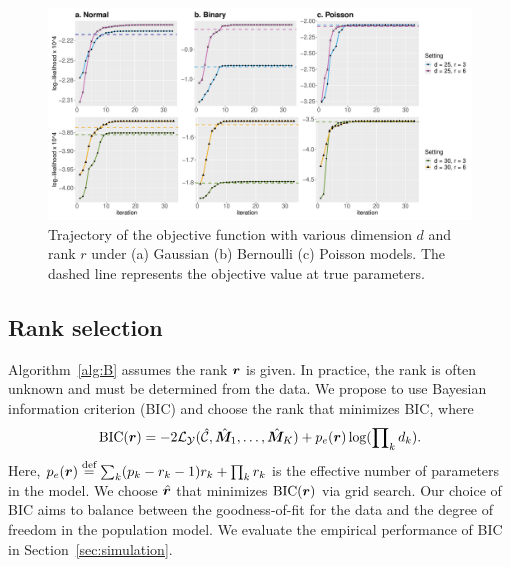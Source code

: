 \documentclass[12pt]{article}
\theoremstyle{definition}
\theoremstyle{definition}
\begin{document}
\begin{figure}[t]
\centering
\includegraphics[width=15cm]{loglike.pdf}
\vspace{-.25cm}
\caption{Trajectory of the objective function with various dimension $d$ and rank $r$ under (a) Gaussian (b) Bernoulli (c) Poisson models. The dashed line represents the objective value at true parameters. }\label{fig:loglike}
\vspace{-.3cm}
\end{figure}



\subsection{Rank selection}\label{sec:tuning}
Algorithm~\ref{alg:B} assumes the rank $\bm{r}$ is given. In practice, the rank is often unknown and must be determined from the data. We propose to use Bayesian information criterion (BIC) and choose the rank that minimizes BIC, where
\begin{equation}\label{eq:BIC}
\textup{BIC}(\bm{r})=-2\mathcal{L}_{\mathcal{Y}}(\hat {\mathcal{C}}, \hat {\bm M}_1,\ldots,\hat {\bm M}_K)+p_e(\bm{r})\log (\prod\nolimits_k d_k).
\end{equation}
Here, $p_e(\bm{r})\stackrel{\textup{def}}{=}\sum_k (p_k-r_k-1)r_k+\prod_k r_k$ is the effective number of parameters in the model. We choose $\hat {\bm{r}}$ that minimizes $\textup{BIC}(\bm{r})$ via grid search. Our choice of BIC aims to balance between the goodness-of-fit for the data and the degree of freedom in the population model. We evaluate the empirical performance of BIC in Section~\ref{sec:simulation}.  

\end{document}
